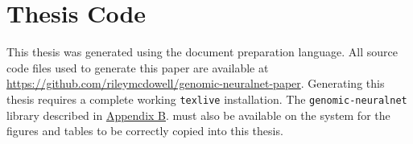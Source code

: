 \chapter*{Thesis Code}

This thesis was generated using the \latex document preparation language. 
All source code files used to generate this paper are available at 
\url{https://github.com/rileymcdowell/genomic-neuralnet-paper}. Generating
this thesis requires a complete working \texttt{texlive} installation.
The \texttt{genomic-neuralnet} library described in
\hyperref[app:analysis-code]{Appendix B}. must also be available on the system for the
figures and tables to be correctly copied into this thesis.



